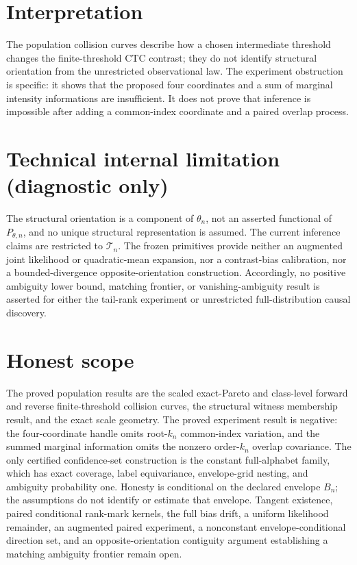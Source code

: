 \documentclass{article}
\begin{document}
\section{Interpretation}

The population collision curves describe how a chosen intermediate threshold changes the finite-threshold CTC contrast; they do not identify structural orientation from the unrestricted observational law.  The experiment obstruction is specific: it shows that the proposed four coordinates and a sum of marginal intensity informations are insufficient.  It does not prove that inference is impossible after adding a common-index coordinate and a paired overlap process.

\section*{Technical internal limitation (diagnostic only)}

The structural orientation is a component of \(\theta_n\), not an asserted functional of \(P_{\theta,n}\), and no unique structural representation is assumed.  The current inference claims are restricted to \(\mathcal T_n\).  The frozen primitives provide neither an augmented joint likelihood or quadratic-mean expansion, nor a contrast-bias calibration, nor a bounded-divergence opposite-orientation construction.  Accordingly, no positive ambiguity lower bound, matching frontier, or vanishing-ambiguity result is asserted for either the tail-rank experiment or unrestricted full-distribution causal discovery.

\section{Honest scope}

The proved population results are the scaled exact-Pareto and class-level forward and reverse finite-threshold collision curves, the structural witness membership result, and the exact scale geometry.  The proved experiment result is negative: the four-coordinate handle omits root-\(k_n\) common-index variation, and the summed marginal information omits the nonzero order-\(k_n\) overlap covariance.  The only certified confidence-set construction is the constant full-alphabet family, which has exact coverage, label equivariance, envelope-grid nesting, and ambiguity probability one.  Honesty is conditional on the declared envelope \(B_n\); the assumptions do not identify or estimate that envelope.  Tangent existence, paired conditional rank-mark kernels, the full bias drift, a uniform likelihood remainder, an augmented paired experiment, a nonconstant envelope-conditional direction set, and an opposite-orientation contiguity argument establishing a matching ambiguity frontier remain open.
\end{document}
